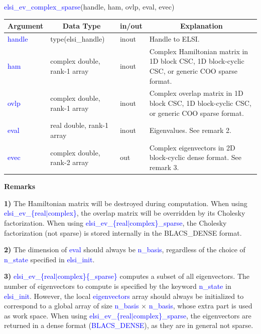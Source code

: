 \documentclass{report}
\newcommand{\tcb}[1]{\textcolor{blue}{#1}}
\begin{document}
\begin{labeling}{\hspace{6cm}}
\item [\hspace{0.3cm} \tcb{elsi\_ev\_complex\_sparse}(handle, ham, ovlp, eval, evec)]
\end{labeling}

\begin{table}[h]
\centering
\begin{tabular}[]{|p{20mm}|p{45mm}|p{15mm}|p{85mm}|}
\hline
\multicolumn{1}{|c|}{\textbf{Argument}} & \multicolumn{1}{c|}{\textbf{Data Type}} & \multicolumn{1}{c|}{\textbf{in/out}} & \multicolumn{1}{c|}{\textbf{Explanation}}\\
\hline
\tcb{handle} & type(elsi\_handle)           & inout & Handle to ELSI.\\
\hline
\tcb{ham}    & complex double, rank-1 array & inout & Complex Hamiltonian matrix in 1D block CSC, 1D block-cyclic CSC, or generic COO sparse format.\\
\hline
\tcb{ovlp}   & complex double, rank-1 array & inout & Complex overlap matrix in 1D block CSC, 1D block-cyclic CSC, or generic COO sparse format.\\
\hline
\tcb{eval}   & real double, rank-1 array    & inout & Eigenvalues. See remark 2.\\
\hline
\tcb{evec}   & complex double, rank-2 array & out   & Complex eigenvectors in 2D block-cyclic dense format. See remark 3.\\
\hline
\end{tabular}
\end{table}

\textbf{Remarks}

\textbf{1)} The Hamiltonian matrix will be destroyed during computation. When using \tcb{elsi\_ev\_\{real$\vert$complex\}}, the overlap matrix will be overridden by its Cholesky factorization. When using \tcb{elsi\_ev\_\{real$\vert$complex\}\_sparse}, the Cholesky factorization (not sparse) is stored internally in the BLACS\_DENSE format.

\textbf{2)} The dimension of \tcb{eval} should always be \tcb{n\_basis}, regardless of the choice of \tcb{n\_state} specified in \tcb{elsi\_init}.

\textbf{3)} \tcb{elsi\_ev\_\{real$\vert$complex\}\{\_sparse\}} computes a subset of all eigenvectors. The number of eigenvectors to compute is specified by the keyword \tcb{n\_state} in \tcb{elsi\_init}. However, the local \tcb{eigenvectors} array should always be initialized to correspond to a global array of size \tcb{n\_basis} $\times$ \tcb{n\_basis}, whose extra part is used as work space. When using \tcb{elsi\_ev\_\{real$\vert$complex\}\_sparse}, the eigenvectors are returned in a dense format (\tcb{BLACS\_DENSE}), as they are in general not sparse.
\end{document}
